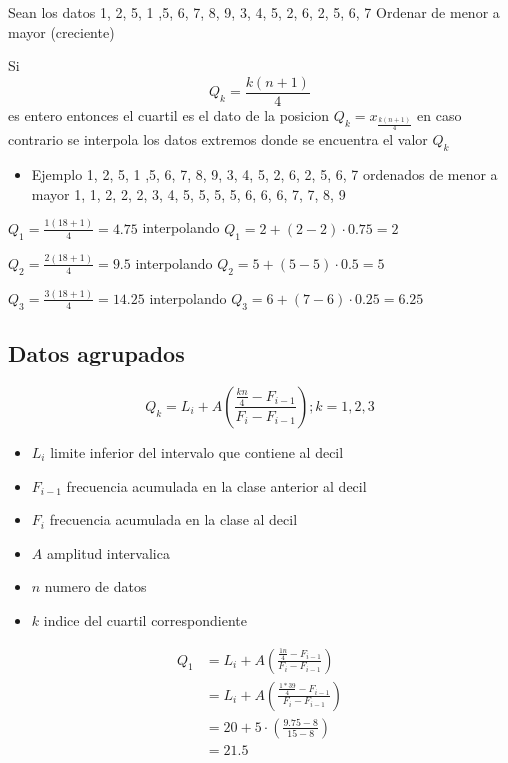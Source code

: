 \documentclass[
  11pt,
]{krantz}
\providecommand{\tightlist}{%
  \setlength{\itemsep}{0pt}\setlength{\parskip}{0pt}}
\theoremstyle{definition}
\theoremstyle{definition}
\theoremstyle{definition}
\theoremstyle{definition}
\theoremstyle{remark}
\begin{document}
Sean los datos 1, 2, 5, 1 ,5, 6, 7, 8, 9, 3, 4, 5, 2, 6, 2, 5, 6, 7 Ordenar de menor a mayor (creciente)

Si \[Q_k=\frac{k(n+1)}{4}\] es entero entonces el cuartil es el dato de la posicion \(Q_k=x_\frac{k(n+1)}{4}\) en caso contrario se interpola los datos extremos donde se encuentra el valor \(Q_k\)

\begin{itemize}
\tightlist
\item
  Ejemplo 1, 2, 5, 1 ,5, 6, 7, 8, 9, 3, 4, 5, 2, 6, 2, 5, 6, 7 ordenados de menor a mayor 1, 1, 2, 2, 2, 3, 4, 5, 5, 5, 5, 6, 6, 6, 7, 7, 8, 9
\end{itemize}

\(Q_1=\frac{1(18+1)}{4}=4.75\) interpolando \(Q_1=2+(2-2)\cdot 0.75=2\)

\(Q_2=\frac{2(18+1)}{4}=9.5\) interpolando \(Q_2=5+(5-5)\cdot 0.5=5\)

\(Q_3=\frac{3(18+1)}{4}=14.25\) interpolando \(Q_3=6+(7-6)\cdot 0.25=6.25\)

\hypertarget{datos-agrupados}{%
\subsection{Datos agrupados}\label{datos-agrupados}}

\[Q_k=L_i+ A\left(\frac{\frac{kn}{4}-F_{i-1}}{F_i-F_{i-1}}\right);k=1,2,3\]

\begin{itemize}
\tightlist
\item
  \(L_i\) limite inferior del intervalo que contiene al decil
\item
  \(F_{i-1}\) frecuencia acumulada en la clase anterior al decil
\item
  \(F_i\) frecuencia acumulada en la clase al decil
\item
  \(A\) amplitud intervalica
\item
  \(n\) numero de datos
\item
  \(k\) indice del cuartil correspondiente
\end{itemize}

\[
\begin{aligned}
Q_1&=L_i+ A\left(\frac{\frac{1n}{4}-F_{i-1}}{F_i-F_{i-1}}\right)\\
&=L_i+ A\left(\frac{\frac{1*39}{4}-F_{i-1}}{F_i-F_{i-1}}\right)\\
&=20+ 5\cdot\left(\frac{9.75 -8}{15-8}\right)\\
&=21.5
\end{aligned}
\]
\end{document}
